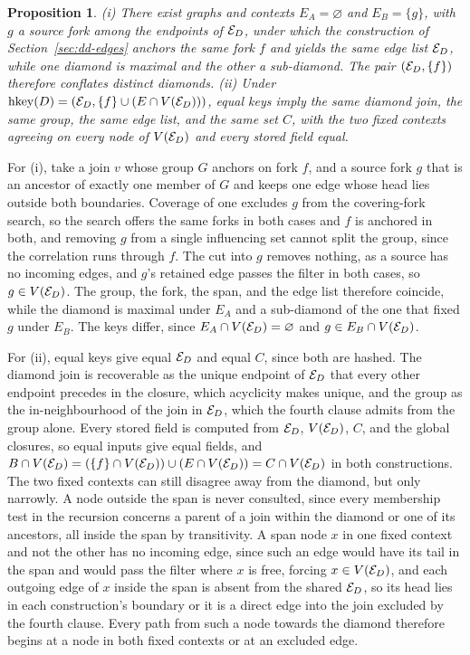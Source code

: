 \documentclass[12pt]{report}
\newtheorem{proposition}[theorem]{Proposition}
\begin{document}
\begin{proposition}
\label{prop:identity}
(i) There exist graphs and contexts $E_A = \varnothing$ and $E_B = \{g\}$, with $g$ a source fork among the endpoints of $\mathcal{E}_D$, under which the construction of Section~\ref{sec:dd-edges} anchors the same fork $f$ and yields the same edge list $\mathcal{E}_D$, while one diamond is maximal and the other a sub-diamond. The pair $(\mathcal{E}_D, \{f\})$ therefore conflates distinct diamonds. (ii) Under $\mathrm{hkey}(D) = (\mathcal{E}_D, \{f\}\cup(E\cap V(\mathcal{E}_D)))$, equal keys imply the same diamond join, the same group, the same edge list, and the same set $C$, with the two fixed contexts agreeing on every node of $V(\mathcal{E}_D)$ and every stored field equal.
\end{proposition}

For (i), take a join $v$ whose group $G$ anchors on fork $f$, and a source fork $g$ that is an ancestor of exactly one member of $G$ and keeps one edge whose head lies outside both boundaries. Coverage of one excludes $g$ from the covering-fork search, so the search offers the same forks in both cases and $f$ is anchored in both, and removing $g$ from a single influencing set cannot split the group, since the correlation runs through $f$. The cut into $g$ removes nothing, as a source has no incoming edges, and $g$'s retained edge passes the filter in both cases, so $g \in V(\mathcal{E}_D)$. The group, the fork, the span, and the edge list therefore coincide, while the diamond is maximal under $E_A$ and a sub-diamond of the one that fixed $g$ under $E_B$. The keys differ, since $E_A \cap V(\mathcal{E}_D) = \varnothing$ and $g \in E_B \cap V(\mathcal{E}_D)$.

For (ii), equal keys give equal $\mathcal{E}_D$ and equal $C$, since both are hashed. The diamond join is recoverable as the unique endpoint of $\mathcal{E}_D$ that every other endpoint precedes in the closure, which acyclicity makes unique, and the group as the in-neighbourhood of the join in $\mathcal{E}_D$, which the fourth clause admits from the group alone. Every stored field is computed from $\mathcal{E}_D$, $V(\mathcal{E}_D)$, $C$, and the global closures, so equal inputs give equal fields, and $B\cap V(\mathcal{E}_D) = (\{f\}\cap V(\mathcal{E}_D)) \cup (E\cap V(\mathcal{E}_D)) = C \cap V(\mathcal{E}_D)$ in both constructions. The two fixed contexts can still disagree away from the diamond, but only narrowly. A node outside the span is never consulted, since every membership test in the recursion concerns a parent of a join within the diamond or one of its ancestors, all inside the span by transitivity. A span node $x$ in one fixed context and not the other has no incoming edge, since such an edge would have its tail in the span and would pass the filter where $x$ is free, forcing $x \in V(\mathcal{E}_D)$, and each outgoing edge of $x$ inside the span is absent from the shared $\mathcal{E}_D$, so its head lies in each construction's boundary or it is a direct edge into the join excluded by the fourth clause. Every path from such a node towards the diamond therefore begins at a node in both fixed contexts or at an excluded edge.
\end{document}

